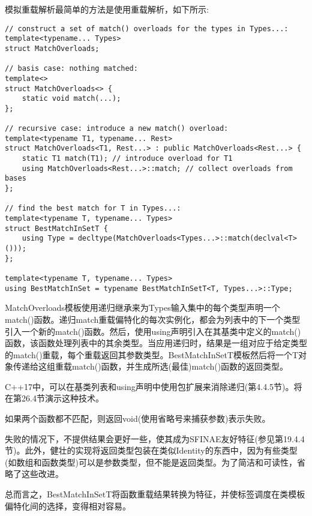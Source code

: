 模拟重载解析最简单的方法是使用重载解析，如下所示:

\begin{lstlisting}[style=styleCXX]
// construct a set of match() overloads for the types in Types...:
template<typename... Types>
struct MatchOverloads;

// basis case: nothing matched:
template<>
struct MatchOverloads<> {
	static void match(...);
};

// recursive case: introduce a new match() overload:
template<typename T1, typename... Rest>
struct MatchOverloads<T1, Rest...> : public MatchOverloads<Rest...> {
	static T1 match(T1); // introduce overload for T1
	using MatchOverloads<Rest...>::match; // collect overloads from bases
};

// find the best match for T in Types...:
template<typename T, typename... Types>
struct BestMatchInSetT {
	using Type = decltype(MatchOverloads<Types...>::match(declval<T>()));
};

template<typename T, typename... Types>
using BestMatchInSet = typename BestMatchInSetT<T, Types...>::Type;
\end{lstlisting}

MatchOverloads模板使用递归继承来为Types输入集中的每个类型声明一个match()函数。递归match重载偏特化的每次实例化，都会为列表中的下一个类型引入一个新的match()函数。然后，使用using声明引入在其基类中定义的match()函数，该函数处理列表中的其余类型。当应用递归时，结果是一组对应于给定类型的match()重载，每个重载返回其参数类型。BestMatchInSetT模板然后将一个T对象传递给这组重载match()函数，并生成所选(最佳)match()函数的返回类型。

\begin{tcolorbox}[colback=webgreen!5!white,colframe=webgreen!75!black]
\hspace*{0.75cm}C++17中，可以在基类列表和using声明中使用包扩展来消除递归(第4.4.5节)。将在第26.4节演示这种技术。
\end{tcolorbox}

如果两个函数都不匹配，则返回void(使用省略号来捕获参数)表示失败。

\begin{tcolorbox}[colback=webgreen!5!white,colframe=webgreen!75!black]
\hspace*{0.75cm}失败的情况下，不提供结果会更好一些，使其成为SFINAE友好特征(参见第19.4.4节)。此外，健壮的实现将返回类型包装在类似Identity的东西中，因为有些类型(如数组和函数类型)可以是参数类型，但不能是返回类型。为了简洁和可读性，省略了这些改进。
\end{tcolorbox}

总而言之，BestMatchInSetT将函数重载结果转换为特征，并使标签调度在类模板偏特化间的选择，变得相对容易。










